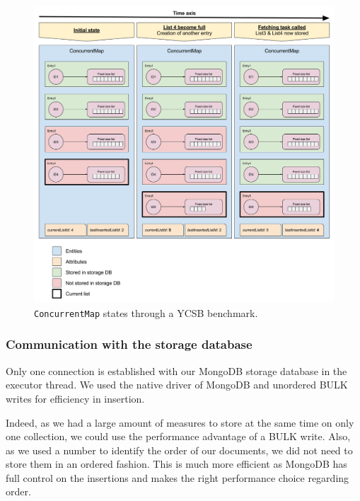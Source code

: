 \documentclass[a4paper,11pt]{report}
\begin{document}
\begin{figure}[ht]
\begin{center}
\includegraphics[width=1\linewidth]{images/concurrent_map_scheme.png}
\caption{\texttt{ConcurrentMap} states through a YCSB benchmark.}
\label{concurrent_map_scheme}
\end{center}
\end{figure}

\clearpage

\subsubsection{Communication with the storage database}

Only one connection is established with our MongoDB storage database in the executor thread. We used the native driver of MongoDB and unordered BULK writes for efficiency in insertion.

Indeed, as we had a large amount of measures to store at the same time on only one collection, we could use the performance advantage of a BULK write. Also, as we used a number to identify the order of our documents, we did not need to store them in an ordered fashion. This is much more efficient as MongoDB has full control on the insertions and makes the right performance choice regarding order. 
\end{document}
